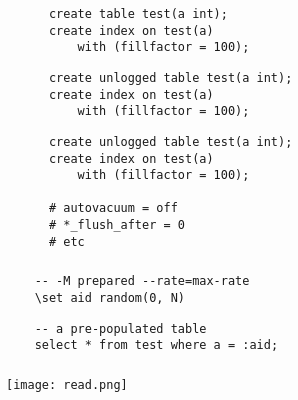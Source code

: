 \documentclass[usenames,dvipsnames, 18pt, compress, aspectratio=169]{beamer}
\begin{document}
\begin{frame}[fragile]{}
    \frametitle{}

    \begin{overprint}[\textwidth]
        \begin{verbatim}
      create table test(a int);
      create index on test(a)
          with (fillfactor = 100);
        \end{verbatim}

        \begin{verbatim}
      create unlogged table test(a int);
      create index on test(a)
          with (fillfactor = 100);
        \end{verbatim}

        \begin{verbatim}
      create unlogged table test(a int);
      create index on test(a)
          with (fillfactor = 100);

      # autovacuum = off
      # *_flush_after = 0
      # etc
        \end{verbatim}

    \end{overprint}

\end{frame}

\begin{frame}[fragile]{}
    \frametitle{}

    \begin{verbatim}
    -- -M prepared --rate=max-rate
    \set aid random(0, N)
    \end{verbatim}

    \begin{verbatim}
    -- a pre-populated table
    select * from test where a = :aid;
    \end{verbatim}

\end{frame}

\begin{frame}[fragile]{}
    \frametitle{}
    \begin{center}

        \texttt{[image: read.png]}

    \end{center}
\end{frame}
\end{document}
